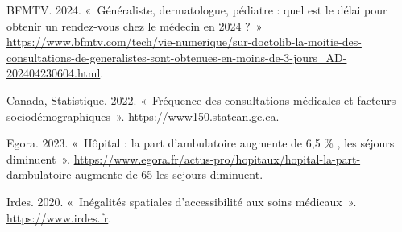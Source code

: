 \documentclass[
]{article}
\newlength{\cslhangindent}
\newlength{\cslentryspacingunit} %
\newenvironment{CSLReferences}[2] %
 {%
  \setlength{\parindent}{0pt}
  \ifodd #1
  \let\oldpar\par
  \def\par{\hangindent=\cslhangindent\oldpar}
  \fi
  \setlength{\parskip}{#2\cslentryspacingunit}
 }%
 {}
\begin{document}
\hypertarget{refs}{}
\begin{CSLReferences}{1}{0}
\leavevmode{}%
BFMTV. 2024. {«~Généraliste, dermatologue, pédiatre : quel est le délai
pour obtenir un rendez-vous chez le médecin en 2024 ?~»}
\url{https://www.bfmtv.com/tech/vie-numerique/sur-doctolib-la-moitie-des-consultations-de-generalistes-sont-obtenues-en-moins-de-3-jours_AD-202404230604.html}.

\leavevmode{}%
Canada, Statistique. 2022. {«~Fréquence des consultations médicales et
facteurs sociodémographiques~»}. \url{https://www150.statcan.gc.ca}.

\leavevmode{}%
Egora. 2023. {«~Hôpital : la part d'ambulatoire augmente de 6,5 \% , les
séjours diminuent~»}.
\url{https://www.egora.fr/actus-pro/hopitaux/hopital-la-part-dambulatoire-augmente-de-65-les-sejours-diminuent}.

\leavevmode{}%
Irdes. 2020. {«~Inégalités spatiales d'accessibilité aux soins
médicaux~»}. \url{https://www.irdes.fr}.

\end{CSLReferences}
\end{document}
